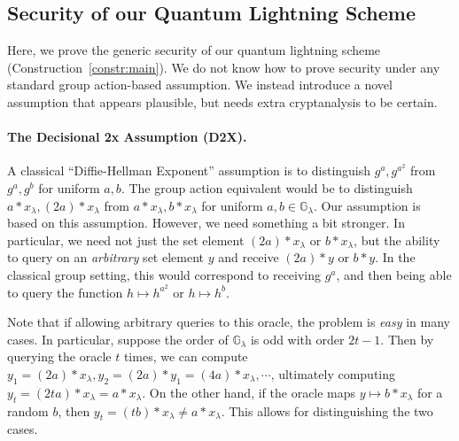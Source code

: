 \documentclass{article}\usepackage[a4paper,margin=20mm]{geometry}
\numberwithin{theorem}{section}
\numberwithin{equation}{section}
\newcommand{\G}{\mathbb{G}}
\begin{document}
\subsection{Security of our Quantum Lightning Scheme}\label{sec:qlightningsec}

Here, we prove the generic security of our quantum lightning scheme (Construction~\ref{constr:main}). We do not know how to prove security under any standard group action-based assumption. We instead introduce a novel assumption that appears plausible, but needs extra cryptanalysis to be certain.

\paragraph{The Decisional 2x Assumption (D2X).} A classical ``Diffie-Hellman Exponent'' assumption is to distinguish $g^a,g^{a^2}$ from $g^a,g^b$ for uniform $a,b$. The group action equivalent would be to distinguish $a*x_\lambda,(2a)*x_\lambda$ from $a*x_\lambda,b*x_\lambda$ for uniform $a,b\in\G_\lambda$. Our assumption is based on this assumption. However, we need something a bit stronger. In particular, we need not just the set element $(2a)*x_\lambda$ or $b*x_\lambda$, but the ability to query on an \emph{arbitrary} set element $y$ and receive $(2a)*y$ or $b*y$. In the classical group setting, this would correspond to receiving $g^a$, and then being able to query the function $h\mapsto h^{a^2}$ or $h\mapsto h^b$. 

Note that if allowing arbitrary queries to this oracle, the problem is \emph{easy} in many cases. In particular, suppose the order of $\G_\lambda$ is odd with order $2t-1$. Then by querying the oracle $t$ times, we can compute $y_1=(2a)*x_\lambda,y_2=(2a)*y_1=(4a)*x_\lambda,\cdots$, ultimately computing $y_t=(2ta)*x_\lambda=a*x_\lambda$. On the other hand, if the oracle maps $y\mapsto b*x_\lambda$ for a random $b$, then $y_t=(tb)*x_\lambda\neq a*x_\lambda$. This allows for distinguishing the two cases.
\end{document}
